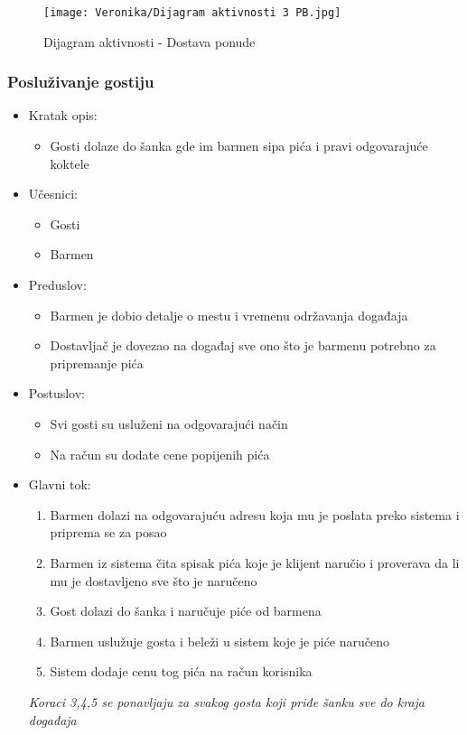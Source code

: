 \documentclass[a4paper]{article}
\begin{document}
\begin{figure}[H]
    \centering
    \texttt{[image: Veronika/Dijagram aktivnosti 3 PB.jpg]}
    \caption{Dijagram aktivnosti - Dostava ponude}
    \label{fig:PrenosiviBar}
\end{figure}

\subsubsection{Posluživanje gostiju}

\begin{itemize}
    \item Kratak opis:
        \begin{itemize}
            \item Gosti dolaze do šanka gde im barmen sipa pića i pravi odgovarajuće koktele 
        \end{itemize}
    \item Učesnici:
        \begin{itemize}
            \item Gosti
            \item Barmen
        \end{itemize}
    \item Preduslov:
        \begin{itemize}
            \item Barmen je dobio detalje o mestu i vremenu održavanja događaja
            \item Dostavljač je dovezao na događaj sve ono što je barmenu potrebno za pripremanje pića
        \end{itemize}
    \item Postuslov:
        \begin{itemize}
            \item Svi gosti su usluženi na odgovarajući način
            \item Na račun su dodate cene popijenih pića
        \end{itemize}
    \item Glavni tok:
        \begin{enumerate}
            \item Barmen dolazi na odgovarajuću adresu koja mu je poslata preko sistema i priprema se za posao
            \item Barmen iz sistema čita spisak pića koje je klijent naručio i proverava da li mu je dostavljeno sve što je naručeno
           \item Gost dolazi do šanka i naručuje piće od barmena
		   \item Barmen uslužuje gosta i beleži u sistem koje je piće naručeno
		   \item Sistem dodaje cenu tog pića na račun korisnika
		  \end{enumerate}
		\textit{Koraci 3,4,5 se ponavljaju za svakog gosta koji priđe šanku sve do kraja događaja}
	

\end{itemize}
\end{document}
